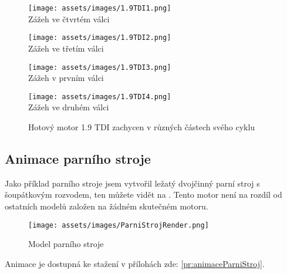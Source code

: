 \begin{figure}[H]
    \begin{minipage}[b]{0.5\linewidth}
        \centering
        \texttt{[image: assets/images/1.9TDI1.png]}\\
        {Zážeh ve čtvrtém válci}
        \vspace{4ex}
    \end{minipage}
    \begin{minipage}[b]{0.5\linewidth}
        \centering
        \texttt{[image: assets/images/1.9TDI2.png]}\\
        {Zážeh ve třetím válci}
        \vspace{4ex}
    \end{minipage}
    \begin{minipage}[b]{0.5\linewidth}
        \centering
        \texttt{[image: assets/images/1.9TDI3.png]}\\
        {Zážeh v prvním válci}
        \vspace{4ex}
    \end{minipage}
    \begin{minipage}[b]{0.5\linewidth}
        \centering
        \texttt{[image: assets/images/1.9TDI4.png]}\\
        {Zážeh ve druhém válci}
        \vspace{4ex}
    \end{minipage}
    \caption{Hotový motor 1.9 TDI zachycen v různých částech svého cyklu \jaObr}
    \label{obr:1.9TDIUkazkaHotovo}
\end{figure}

\newpage

\subsection{Animace parního stroje}
{Jako příklad parního stroje jsem vytvořil ležatý dvojčinný parní stroj s šoupátkovým rozvodem, ten můžete vidět na . Tento motor není na rozdíl od ostatních modelů založen na žádném skutečném motoru.}

\begin{figure}[H]
    \centering
    \texttt{[image: assets/images/ParniStrojRender.png]}
    \caption{Model parního stroje \jaObr}
    \label{obr:ParniStrojRender}
\end{figure}

{Animace je dostupná ke stažení v přílohách zde: \ref{pr:animaceParniStroj}.}

